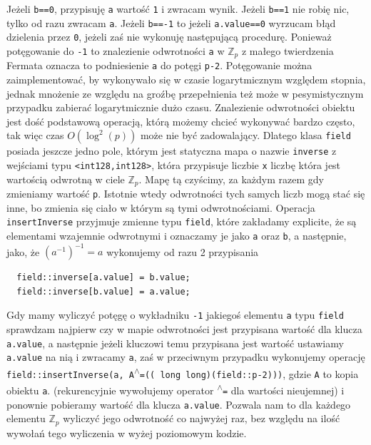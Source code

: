 \documentclass{article}
\begin{document}
Jeżeli \texttt{b==0}, przypisuję \texttt{a} wartość \texttt{1} i zwracam wynik. Jeżeli \texttt{b==1} 
nie robię nic, tylko od razu zwracam \texttt{a}. Jeżeli \texttt{b==-1} to jeżeli \texttt{a.value==0} 
wyrzucam błąd dzielenia przez \texttt{0}, jeżeli zaś nie wykonuję następującą procedurę.
Ponieważ potęgowanie do \texttt{-1} to znalezienie odwrotności \texttt{a} w $\mathbb{Z}_p$
z małego twierdzenia Fermata oznacza to podniesienie \texttt{a} do potęgi 
\texttt{p-2}. Potęgowanie można zaimplementować, by wykonywało się w czasie logarytmicznym
względem stopnia, jednak mnożenie ze względu na groźbę przepełnienia
też może w pesymistycznym przypadku zabierać logarytmicznie dużo czasu.
Znalezienie odwrotności obiektu jest dość podstawową operacją, którą 
możemy chcieć wykonywać bardzo często, tak więc czas $O(\log ^2(p))$ może
nie być zadowalający. Dlatego klasa \texttt{field} posiada jeszcze jedno pole, którym
jest statyczna mapa o nazwie \texttt{inverse} z wejściami typu 
\texttt{<\texttt{\textunderscore \textunderscore int128},\texttt{\textunderscore \textunderscore int128}>}, która przypisuje 
liczbie \texttt{x} liczbę która jest wartością odwrotną w ciele $\mathbb{Z}_p$. Mapę tą
czyścimy, za każdym razem gdy zmieniamy wartość \texttt{p}. Istotnie wtedy odwrotności
tych samych liczb mogą stać się inne, bo zmienia się ciało w którym są tymi odwrotnościami.
Operacja \texttt{insertInverse} przyjmuje zmienne typu \texttt{field}, które zakładamy
explicite, że są elementami wzajemnie odwrotnymi i oznaczamy je jako \texttt{a} oraz \texttt{b}, 
a następnie, jako, że $(a^{-1})^{-1}=a$ wykonujemy od razu 2 przypisania
\begin{verbatim}
  field::inverse[a.value] = b.value;
  field::inverse[b.value] = a.value;
\end{verbatim}
Gdy mamy wyliczyć potęgę o wykładniku \texttt{-1} jakiegoś elementu \texttt{a} typu \texttt{field} sprawdzam 
najpierw czy w mapie odwrotności jest przypisana wartość dla klucza \texttt{a.value}, 
a następnie jeżeli kluczowi temu przypisana jest wartość ustawiamy \texttt{a.value} na nią i zwracamy \texttt{a}, zaś
w przeciwnym przypadku wykonujemy operację 
\texttt{field::insertInverse(a, A\textsuperscript{$\wedge$}=(( long long)(field::p-2)))}, gdzie \texttt{A} to kopia
obiektu \texttt{a}.
(rekurencyjnie wywołujemy operator \texttt{\textsuperscript{$\wedge$}=} dla wartości nieujemnej)
i ponownie pobieramy wartość dla klucza \texttt{a.value}. Pozwala nam to dla każdego elementu 
$\mathbb{Z}_p$ wyliczyć
jego odwrotność co najwyżej raz, bez względu na ilość wywołań tego wyliczenia w wyżej poziomowym 
kodzie. 
\end{document}
